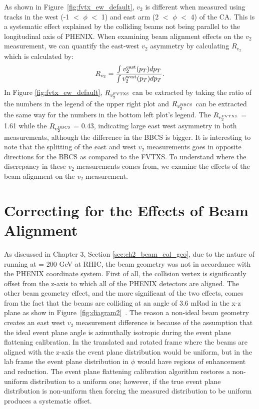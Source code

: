 As shown in Figure~\ref{fig:fvtx_ew_default}, $v_2$ is different when measured using tracks in the west (-1 $<$ $\phi$ $<$ 1) and east arm (2 $<$ $\phi$ $<$ 4) of the CA. This is a systematic effect explained by the colliding beams not being parallel to the longitudinal axis of PHENIX. When examining beam alignment effects on the $v_2$ measurement, we can quantify the east-west $v_2$ asymmetry by calculating $R_{v_2}$ which is calculated by: 
\begin{equation}
R_{v_2} = \frac{\int{v_2^{\rm east}(p_T)d\mbox{$p_T$}}}{\int{v_2^{\rm west}(p_T)d\mbox{$p_T$}}}.
\end{equation}
In Figure \ref{fig:fvtx_ew_default}, $R_{v_2^{\rm FVTXS}}$ can be extracted by taking the ratio of the numbers in the legend of the upper right plot and $R_{v_2^{\rm BBCS}}$ can be extracted the same way for the numbers in the bottom left plot's legend. The $R_{v_2^{\rm FVTXS}}$ = 1.61 while the $R_{v_2^{\rm BBCS}}$ = 0.43, indicating large east west asymmetry in both measurements, although the difference in the BBCS is bigger. It is interesting to note that the splitting of the east and west $v_2$ measurements goes in opposite directions for the BBCS as compared to the FVTXS. To understand where the discrepancy in these $v_2$ measurements comes from, we examine the effects of the beam alignment on the $v_2$ measurement.
\section{Correcting for the Effects of Beam Alignment}
As discussed in Chapter 3, Section \ref{sec:ch2_beam_col_geo}, due to the nature of running \pau at \sqsn = 200 GeV at RHIC, the beam geometry was not in accordance with the PHENIX coordinate system. First of all, the collision vertex is significantly offset from the z-axis to which all of the PHENIX detectors are aligned. The other beam geometry effect, and the more significant of the two effects, comes from the fact that the beams are colliding at an angle of 3.6 mRad in the x-z plane as show in Figure~\ref{fig:diagram2}~\cite{BNL_Run15_Operations}. The reason a non-ideal beam geometry creates an east west $v_2$ measurement difference is because of the assumption that the ideal event plane angle is azimuthally isotropic during the event plane flattening calibration. In the translated and rotated frame where the beams are aligned with the z-axis the event plane distribution would be uniform, but in the lab frame the event plane distribution in $\phi$ would have regions of enhancement and reduction. The event plane flattening calibration algorithm restores a non-uniform distribution to a uniform one; however, if the true event plane distribution is non-uniform then forcing the measured distribution to be uniform produces a systematic offset.

